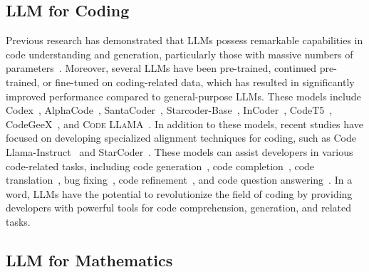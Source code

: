 \subsection{LLM for Coding}

Previous research has demonstrated that LLMs possess remarkable capabilities in code understanding and generation, particularly those with massive numbers of parameters~\citep{palm, palm2, gopher, chinchilla}. Moreover, several LLMs have been pre-trained, continued pre-trained, or fine-tuned on coding-related data, which has resulted in significantly improved performance compared to general-purpose LLMs. These models include Codex~\cite{codex}, AlphaCode~\citep{AlphaCode}, SantaCoder~\citep{santacoder}, Starcoder-Base~\citep{starcoder}, InCoder~\citep{incoder}, CodeT5~\citep{codet5}, CodeGeeX~\citep{CodeGeeX}, and \textsc{Code LLaMA}~\citep{code_llama}. In addition to these models, recent studies have focused on developing specialized alignment techniques for coding, such as Code Llama-Instruct~\citep{code_llama} and StarCoder~\citep{starcoder}. These models can assist developers in various code-related tasks, including code generation~\citep{codex,mbpp}, code completion~\citep{repocoder}, code translation~\citep{code_translation_compiler}, bug fixing~\citep{octopack}, code refinement~\citep{code_refinement}, and code question answering~\citep{code_qa}. In a word, LLMs have the potential to revolutionize the field of coding by providing developers with powerful tools for code comprehension, generation, and related tasks.

\subsection{LLM for Mathematics}

